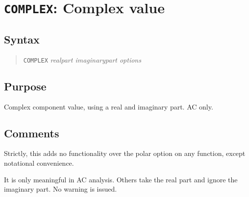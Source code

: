 %
%
%
%
\section{{\tt COMPLEX}: Complex value}
\subsection{Syntax}
\begin{verse}
{\tt COMPLEX} {\it realpart imaginarypart options}
\end{verse}
\subsection{Purpose}

Complex component value, using a real and imaginary part.  AC only.
\subsection{Comments}

Strictly, this adds no functionality over the polar option on any
function, except notational convenience.

It is only meaningful in AC analysis.  Others take the real part and
ignore the imaginary part.  No warning is issued.
